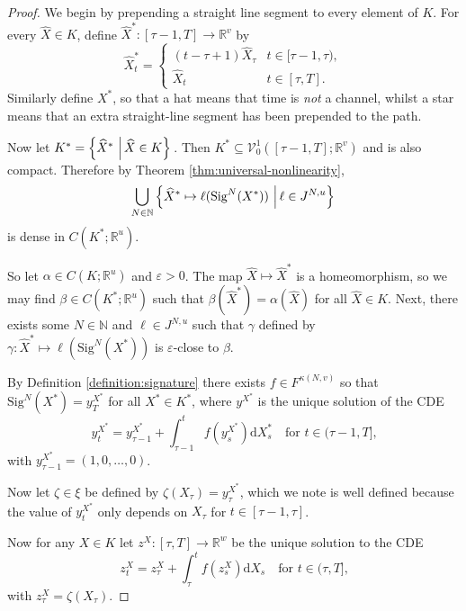 \documentclass{article}
\theoremstyle{plain}
\theoremstyle{definition}
\newcommand{\reals}{\mathbb{R}}
\newcommand{\naturals}{\mathbb{N}}
\newcommand{\set}[2]{\left\{{#1}\,\left\vert\,{#2}\vphantom{{#1}}\right\}\right.}
\begin{document}
	\begin{proof}
	We begin by prepending a straight line segment to every element of $K$. For every $\widehat{X} \in K$, define $\widehat{X}^* \colon [\tau - 1, T] \to \reals^v$ by
	\begin{equation*}
	\widehat{X}^*_t = \begin{cases}
	(t - \tau + 1)\widehat{X}_\tau & t \in [\tau -1 , \tau),\\
	\widehat{X}_t & t \in [\tau, T].
	\end{cases}
	\end{equation*}
	Similarly define $X^*$, so that a hat means that time is \emph{not} a channel, whilst a star means that an extra straight-line segment has been prepended to the path.
	
	Now let $K^* = \set{\widehat{X}^*}{\widehat{X} \in K}$. Then $K^* \subseteq \mathcal{V}^1_0([\tau - 1, T]; \reals^v)$ and is also compact. Therefore by Theorem \ref{thm:universal-nonlinearity},
	\begin{equation*}
	\bigcup_{N \in \naturals} \set{\widehat{X}^* \mapsto \ell(\mathrm{Sig}^N(X^*))}{\ell \in J^{N, u}}
	\end{equation*}
	is dense in $C(K^*; \reals^u)$.
	
	So let $\alpha \in C(K; \reals^u)$ and $\varepsilon > 0$. The map $\widehat{X} \mapsto \widehat{X}^*$ is a homeomorphism, so we may find $\beta \in C(K^*; \reals^u)$ such that $\beta(\widehat{X}^*) = \alpha(\widehat{X})$ for all $\widehat{X} \in K$. Next, there exists some $N \in \naturals$ and $\ell \in J^{N, u}$ such that $\gamma$ defined by $\gamma \colon \widehat{X}^* \mapsto \ell(\mathrm{Sig}^N(X^*))$ is $\varepsilon$-close to $\beta$.
	
	By Definition \ref{definition:signature} there exists $f \in F^{\kappa(N, v)}$ so that $\mathrm{Sig}^N(X^*) = y^{X^*}_T$ for all $X^* \in K^*$, where $y^{X^*}$ is the unique solution of the CDE
	\begin{equation*}
	y^{X^*}_t = y^{X^*}_{\tau - 1} + \int_{\tau - 1}^t f(y^{X^*}_s) \mathrm{d}X^*_s\quad\text{for $t \in (\tau - 1, T]$,}
	\end{equation*}
	with $y^{X^*}_{\tau - 1} = (1, 0, \ldots, 0)$.
	
	Now let $\zeta \in \xi$ be defined by $\zeta(X_\tau) = y^{X^*}_\tau$, which we note is well defined because the value of $y^{X^*}_t$ only depends on $X_\tau$ for $t \in [\tau - 1, \tau]$.
	
	Now for any $X \in K$ let $z^{X} \colon [\tau, T] \to \reals^w$ be the unique solution to the CDE
	\begin{equation*}
	z^{X}_t = z^{X}_\tau + \int_\tau^t f(z^{X}_s) \mathrm{d}X_s\quad\text{for $t \in (\tau, T]$,}
	\end{equation*}
	with $z^{X}_\tau = \zeta(X_\tau)$.
	

\end{proof}
\end{document}
